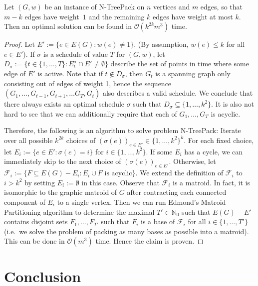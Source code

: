 \documentclass[runningheads]{llncs}
\newcommand{\N}{\mathbb{N}}
\newcommand{\set}[1]{\{ #1 \}}
\newcommand{\fromto}[2]{\set{#1, \ldots, #2}}
\newcommand{\bigO}{\mathcal{O}}
\newcommand{\xxxNTP}{{\sc N-TreePack}}
\begin{document}
\begin{theorem}
Let $(G,w)$ be an instance of {\xxxNTP} on $n$ vertices and $m$ edges, so that $m-k$ edges have weight~$1$ and the remaining $k$ edges have weight at most $k$. 
Then an optimal solution can be found in $\bigO(k^{2k}m^3)$ time.
\end{theorem}

\begin{proof}
Let $E' := \set{e \in E(G) : w(e) \neq 1}$. (By assumption, $w(e) \leq k$ for all $e \in E'$). If $\sigma$ is a schedule of value $T$ for $(G, w)$,  let $D_\sigma := \set{t \in \fromto{1}{T} : E_t^\sigma \cap E' \neq \emptyset}$ describe the set of points in time where some edge of $E'$ is active. Note that  if $t \not\in D_\sigma$, then $G_t$ is a spanning graph only consisting out of edges of weight 1, hence the sequence $(G_1, \dots, G_{t-1}, G_{t+1}, \dots G_T, G_t)$ also describes a valid schedule. We conclude that there always exists an optimal schedule $\sigma$ such that $D_\sigma \subseteq \fromto{1}{k^2}$. It is also not  hard to see that we can additionally require that each of $G_1, \dots, G_T$ is acyclic.

Therefore, the following is an algorithm to solve problem {\xxxNTP}: Iterate over all possible $k^{2k}$ choices of $(\sigma(e))_{e \in E'} \in \fromto{1}{k^2}^k$. For each fixed choice, let $E_i := \set{e \in E' : \sigma(e) = i}$ for $i \in \fromto{1}{k^2}$. If some $E_i$ has a cycle, we can immediately skip to the next choice of $(\sigma(e))_{e \in E'}$. Otherwise, let $\mathcal{F}_i := \set{F \subseteq E(G)-E_i : E_i \cup F \text{ is acyclic}}$. We extend the definition of $\mathcal{F}_i$ to $i > k^2$ by setting $E_i := \emptyset$ in this case. Observe that $\mathcal{F}_i$ is a matroid. In fact, it is isomorphic to the graphic matroid of $G$ after contracting each connected component of $E_i$ to a single vertex. Then we can run
 Edmond's Matroid Partitioning algorithm \cite{edmonds1965minimum} to determine the maximal $T' \in \N_0$ such that $E(G)-E'$ contains disjoint sets $F_1, \dots, F_{T'}$ such that $F_i$ is a base of $\mathcal{F}_i$ for all $i \in \fromto{1}{T'}$ (i.e.\ we solve the problem of packing as many bases as possible into a matroid). This can be done in $\bigO(
m^3)$ time. Hence the claim is proven.
\end{proof}


\section{Conclusion}
\label{sec:conclusion}
\end{document}
